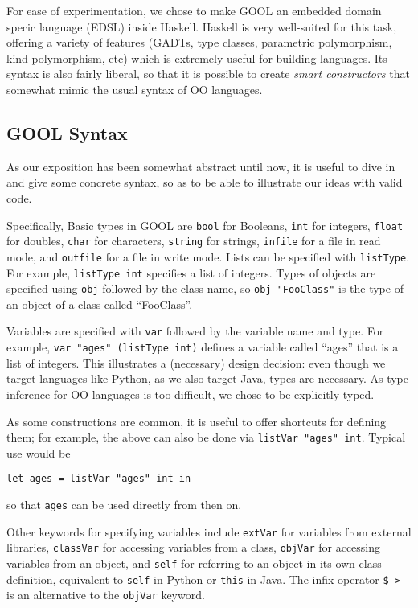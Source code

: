 \documentclass[sigplan,review,anonymous,prologue,dvipsnames]{acmart}
\begin{document}
For ease of experimentation, we chose to make GOOL an embedded
domain specic language (EDSL) inside Haskell.  Haskell is very well-suited
for this task, offering a variety of features (GADTs, type classes,
parametric polymorphism, kind polymorphism, etc) which is extremely useful
for building languages.  Its syntax is also fairly liberal, so that it is
possible to create \emph{smart constructors} that somewhat mimic the
usual syntax of OO languages.

\subsection{GOOL Syntax} \label{ssec:syntax}

As our exposition has been somewhat abstract until now, it is useful to
dive in and give some concrete syntax, so as to be able to illustrate
our ideas with valid code.

Specifically, Basic types in GOOL are \verb|bool| for Booleans, 
\verb|int| for integers, \verb|float| for doubles, \verb|char| 
for characters, \verb|string| for strings, \verb|infile| for a file 
in read mode, and \verb|outfile| for a file in write mode. Lists can be 
specified with \verb|listType|. For example, \verb|listType int| 
specifies a list of integers. Types of objects are specified using 
\verb|obj| followed by the class name, so \verb|obj "FooClass"| is the type of 
an object of a class called ``FooClass''. 

Variables are specified with \verb|var| followed by the variable name and type. 
For example, \verb|var "ages" (listType int)| defines a variable called 
``ages'' that is a list of integers. This illustrates a (necessary) design
decision: even though we target languages like Python, as we also target
Java, types are necessary. As type inference for OO languages is too
difficult, we chose to be explicitly typed.

As some constructions are common, it is useful to offer shortcuts for
defining them; for example, the above can also be done via
\verb|listVar "ages" int|. Typical use would be
\begin{lstlisting}
let ages = listVar "ages" int in
\end{lstlisting}
so that \verb|ages| can be used directly from then on.

Other keywords for specifying variables include \verb|extVar| for variables 
from external libraries, \verb|classVar| for accessing variables from a class, 
\verb|objVar| for accessing variables from an object, and \verb|self| for 
referring to an object in its own class definition, equivalent to \verb|self| 
in Python or \verb|this| in Java. The infix operator \verb|$->| is an 
alternative to the \verb|objVar| keyword.
\end{document}
